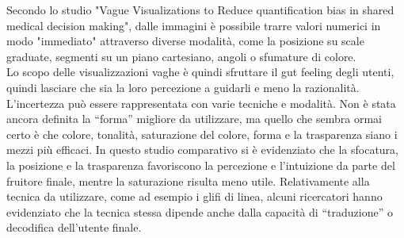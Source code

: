 Secondo lo studio "Vague Visualizations to Reduce quantification bias in shared medical decision making", dalle immagini è possibile trarre valori numerici in modo "immediato" attraverso diverse modalità, come la posizione su scale graduate, segmenti su un piano cartesiano, angoli o sfumature di colore.\\
Lo scopo delle visualizzazioni vaghe è quindi sfruttare il gut feeling degli utenti, quindi lasciare che sia la loro percezione a guidarli e meno la razionalità.\\
L'incertezza può essere rappresentata con varie tecniche e modalità. Non è stata ancora definita la “forma”
migliore da utilizzare, ma quello che sembra ormai certo è che colore, tonalità, saturazione del colore,
forma e la trasparenza siano i mezzi più efficaci. In questo studio comparativo si è evidenziato che la
sfocatura, la posizione e la trasparenza favoriscono la percezione e l'intuizione da parte del fruitore finale, mentre la saturazione risulta meno utile. Relativamente alla tecnica da utilizzare, come ad esempio i glifi di linea, alcuni ricercatori hanno evidenziato che la tecnica stessa dipende anche dalla capacità di “traduzione” o decodifica dell'utente finale.